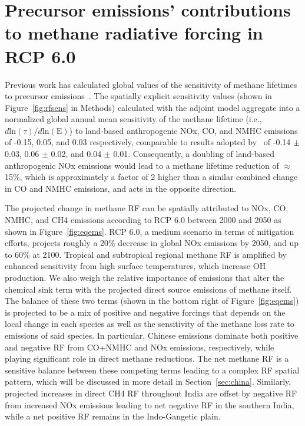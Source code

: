 \section{Precursor emissions' contributions to methane radiative forcing in RCP 6.0}

Previous work has calculated global values of the sensitivity of methane lifetimes to precursor emissions~\citep{ref:fry2012,ref:holmes2013}. The spatially explicit sensitivity values (shown in Figure~\ref{fig:rfsens} in Methods) calculated with the adjoint model aggregate into a normalized global annual mean sensitivity of the methane lifetime (i.e., $d \mathrm{ln}(\tau)/d\mathrm{ln}(\mathrm{E})$) to land-based anthropogenic NOx, CO, and NMHC emissions of -0.15, 0.05, and 0.03 respectively, comparable to results adopted by~\citet{ref:holmes2013} of -0.14 $\pm$ 0.03, 0.06 $\pm$ 0.02, and 0.04 $\pm$ 0.01. Consequently, a doubling of land-based anthropogenic NOx emissions would lead to a methane lifetime reduction of $\approx$ 15\%, which is approximately a factor of 2 higher than a similar combined change in CO and NMHC emissions, and acts in the opposite direction.  


The projected change in methane RF can be spatially attributed to NOx, CO, NMHC, and CH4 emissions according to RCP 6.0 between 2000 and 2050 as shown in Figure~\ref{fig:eqems}. RCP 6.0, a medium scenario in terms of mitigation efforts, projects roughly a 20\% decrease in global NOx emissions by 2050, and up to 60\% at 2100. Tropical and subtropical regional methane RF is amplified by enhanced sensitivity from high surface temperatures, which increase OH production. We also weigh the relative importance of emissions that alter the chemical sink term with the projected direct source emissions of methane itself. The balance of these two terms (shown in the bottom right of Figure~\ref{fig:eqems}) is projected to be a mix of positive and negative forcings that depends on the local change in each species as well as the sensitivity of the methane loss rate to emissions of said species. In particular, Chinese emissions dominate both positive and negative RF from CO+NMHC and NOx emissions, respectively, while playing significant role in direct methane reductions.  The net methane RF is a sensitive balance between these competing terms leading to a complex RF spatial pattern, which will be discussed in more detail in Section~\ref{sec:china}.  Similarly, projected increases in direct CH4 RF throughout India are offset by negative RF from increased NOx emissions leading to net negative RF in the southern India, while a net positive RF remains in the Indo-Gangetic plain.  

